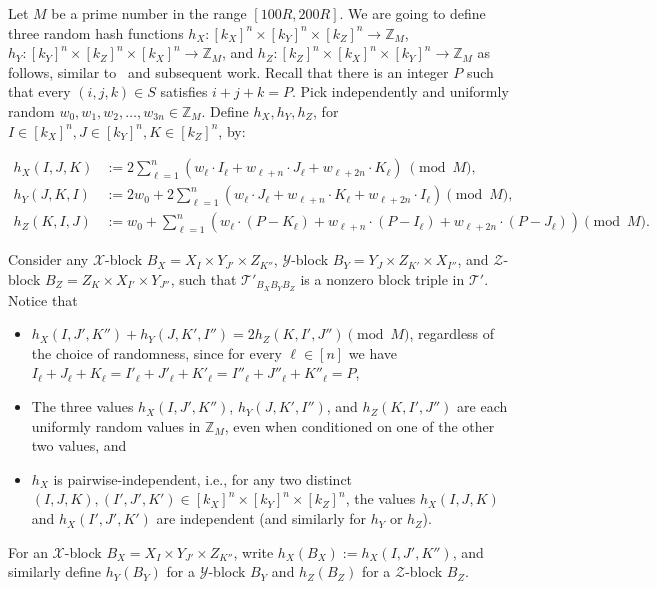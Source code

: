 \PassOptionsToPackage{shortlabels}{enumitem}\documentclass[10pt,a4paper]{article}
\newcommand{\T}{\mathcal{T}}
\newcommand{\X}{\mathcal{X}}
\newcommand{\Y}{\mathcal{Y}}
\newcommand{\Z}{\mathcal{Z}}
\begin{document}
Let $M$ be a prime number in the range $[100R,200R]$. We are going to define three random hash functions $h_X : [k_X]^n \times [k_Y]^n \times [k_Z]^n \to \mathbb{Z}_M$, $h_Y : [k_Y]^n \times [k_Z]^n \times [k_X]^n \to \mathbb{Z}_M$, and $h_Z : [k_Z]^n \times [k_X]^n \times [k_Y]^n \to \mathbb{Z}_M$ as follows, similar to~\cite{strassenlaser1,coppersmith} and subsequent work.
Recall that there is an integer $P$ such that every $(i,j,k) \in S$ satisfies $i+j+k=P$.
Pick independently and uniformly random $w_0, w_1, w_2, \ldots, w_{3n} \in \mathbb{Z}_M$. Define $h_X, h_Y, h_Z$, for $I \in [k_X]^n,J \in [k_Y]^n, K \in [k_Z]^n$, by:

\begin{align*} h_X (I,J,K) &:= 2\sum_{\ell=1}^n (w_\ell \cdot I_\ell + w_{\ell+n} \cdot J_\ell + w_{\ell+2n} \cdot K_\ell) \ \pmod{M},\\
 h_Y (J,K,I) &:= 2w_0 + 2\sum_{\ell=1}^n (w_\ell \cdot J_\ell + w_{\ell+n} \cdot K_\ell + w_{\ell+2n} \cdot I_\ell) \pmod{M},\\
 h_Z (K,I,J) &:= w_0 + \sum_{\ell=1}^n (w_\ell \cdot (P - K_\ell) + w_{\ell+n} \cdot (P-I_\ell) + w_{\ell+2n} \cdot (P-J_\ell)) \pmod{M}.\end{align*}

Consider any $\X$-block $B_X = X_I \times Y_{J'} \times Z_{K''}$, $\Y$-block $B_Y = Y_{J} \times Z_{K'} \times X_{I''}$, and $\Z$-block $B_Z = Z_{K} \times X_{I'} \times Y_{J''}$, such that $\T'_{B_X B_Y B_Z}$ is a nonzero block triple in $\T'$. Notice that
\begin{itemize}
    \item $h_X(I,J',K'') + h_Y(J,K',I'') = 2h_Z(K,I',J'') \pmod{M}$, regardless of the choice of randomness, since for every $\ell \in [n]$ we have $I_\ell+J_\ell+K_\ell = I'_\ell+J'_\ell+K'_\ell = I''_\ell+J''_\ell+K''_\ell = P$,
    \item The three values $h_X(I,J',K'')$, $h_Y(J,K',I'')$, and $h_Z(K,I',J'')$ are each uniformly random values in $\mathbb{Z}_M$, even when conditioned on one of the other two values, and 
    \item $h_X$ is pairwise-independent, i.e., for any two distinct $(I,J,K), (I',J',K') \in [k_X]^n \times [k_Y]^n \times [k_Z]^n$, the values $h_X(I,J,K)$ and $h_X(I',J',K')$ are independent (and similarly for $h_Y$ or $h_Z$).
\end{itemize}
For an $\X$-block $B_X = X_I \times Y_{J'} \times Z_{K''}$, write $h_X(B_X) := h_X(I,J',K'')$, and similarly define $h_Y(B_Y)$ for a $\Y$-block $B_Y$ and $h_Z(B_Z)$ for a $\Z$-block $B_Z$.
\end{document}
